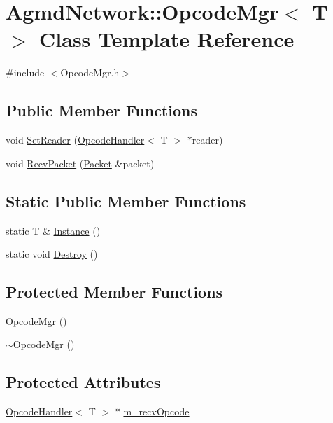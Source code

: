 \hypertarget{class_agmd_network_1_1_opcode_mgr}{\section{Agmd\+Network\+:\+:Opcode\+Mgr$<$ T $>$ Class Template Reference}
\label{class_agmd_network_1_1_opcode_mgr}
}


{\ttfamily \#include $<$Opcode\+Mgr.\+h$>$}

\subsection*{Public Member Functions}
\begin{DoxyCompactItemize}
\item 
void \hyperlink{class_agmd_network_1_1_opcode_mgr_a921a81ccadf27d29d8471007a6a6a472}{Set\+Reader} (\hyperlink{struct_agmd_network_1_1_opcode_handler}{Opcode\+Handler}$<$ T $>$ $\ast$reader)
\item 
void \hyperlink{class_agmd_network_1_1_opcode_mgr_addf7440a6b36b8cbd4ab2756cdc25c6b}{Recv\+Packet} (\hyperlink{class_agmd_network_1_1_packet}{Packet} \&packet)
\end{DoxyCompactItemize}
\subsection*{Static Public Member Functions}
\begin{DoxyCompactItemize}
\item 
static T \& \hyperlink{class_agmd_network_1_1_opcode_mgr_ad30192d83eb07930b799b5c293bbfa29}{Instance} ()
\item 
static void \hyperlink{class_agmd_network_1_1_opcode_mgr_a4140c375821ba7adb7fb6ac2e4ca63c9}{Destroy} ()
\end{DoxyCompactItemize}
\subsection*{Protected Member Functions}
\begin{DoxyCompactItemize}
\item 
\hyperlink{class_agmd_network_1_1_opcode_mgr_a1147baa11674a7b7a6436c04602114db}{Opcode\+Mgr} ()
\item 
\hyperlink{class_agmd_network_1_1_opcode_mgr_acba558db3e94a2a72f68f56ec55d9e59}{$\sim$\+Opcode\+Mgr} ()
\end{DoxyCompactItemize}
\subsection*{Protected Attributes}
\begin{DoxyCompactItemize}
\item 
\hyperlink{struct_agmd_network_1_1_opcode_handler}{Opcode\+Handler}$<$ T $>$ $\ast$ \hyperlink{class_agmd_network_1_1_opcode_mgr_ae7dbf3351028a447e53682aa1ebcc5cb}{m\+\_\+recv\+Opcode}
\end{DoxyCompactItemize}



